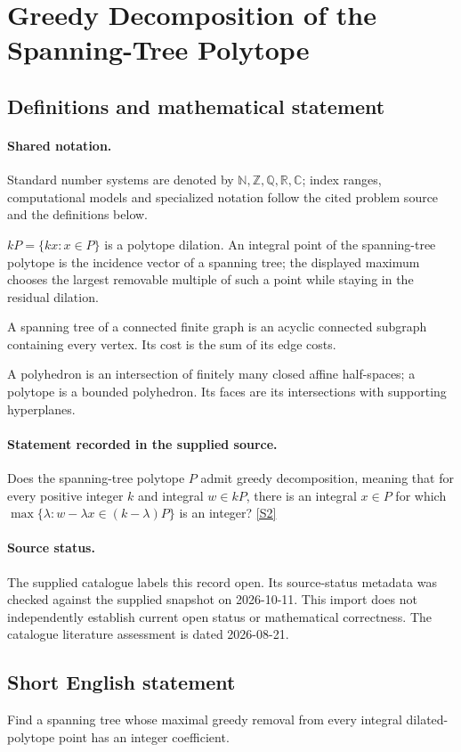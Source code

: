 \documentclass[11pt]{article}
\newcommand{\sref}[2]{\hyperlink{source:#1:#2}{[S#2]}}
\begin{document}
\section{Greedy Decomposition of the Spanning-Tree Polytope}\label{statement}

\subsection{Definitions and mathematical statement}

\paragraph{Shared notation.}Standard number systems are denoted by $\mathbb N,\mathbb Z,\mathbb Q,\mathbb R,\mathbb C$; index ranges, computational models and specialized notation follow the cited problem source and the definitions below.


$kP=\{kx:x\in P\}$ is a polytope dilation. An integral point of the spanning-tree polytope is the incidence vector of a spanning tree; the displayed maximum chooses the largest removable multiple of such a point while staying in the residual dilation.

A spanning tree of a connected finite graph is an acyclic connected subgraph containing every vertex. Its cost is the sum of its edge costs.

A polyhedron is an intersection of finitely many closed affine half-spaces; a polytope is a bounded polyhedron. Its faces are its intersections with supporting hyperplanes.
\paragraph{Statement recorded in the supplied source.}
Does the spanning-tree polytope $P$ admit greedy decomposition, meaning that for every positive integer $k$ and integral $w\in kP$, there is an integral $x\in P$ for which $\max\{\lambda:w-\lambda x\in(k-\lambda)P\}$ is an integer? \sref{statement}{2}
\paragraph{Source status.}
The supplied catalogue labels this record open. Its source-status metadata was checked against the supplied snapshot on 2026-10-11. This import does not independently establish current open status or mathematical correctness. The catalogue literature assessment is dated 2026-08-21.
\subsection{Short English statement}
Find a spanning tree whose maximal greedy removal from every integral dilated-polytope point has an integer coefficient.
\end{document}
